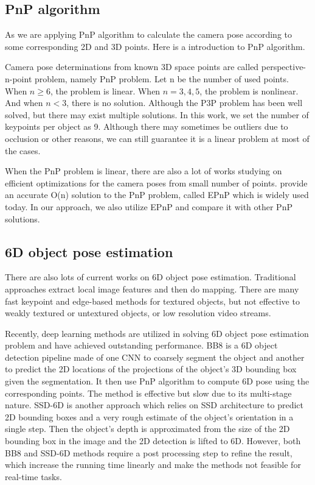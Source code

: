 \subsection{PnP algorithm}

As we are applying PnP algorithm to calculate the camera pose according to some corresponding 2D and 3D points. Here is a introduction to PnP algorithm.

Camera pose determinations from known 3D space points are called perspective-n-point problem, namely PnP problem. Let n be the number of used points. When $n \geq 6$, the problem is linear. When $n = 3,4,5$, the problem is nonlinear. And when $n < 3$, there is no solution. Although the P3P problem has been well solved, but there may exist multiple solutions. In this work, we set the number of keypoints per object as 9. Although there may sometimes be outliers due to occlusion or other reasons, we can still guarantee it is a linear problem at most of the cases.

When the PnP problem is linear, there are also a lot of works studying on efficient optimizations for the camera poses from small number of points. \cite{lepetit2009epnp} provide an accurate O(n) solution to the PnP problem, called EPnP which is widely used today. In our approach, we also utilize EPnP and compare it with other PnP solutions.

\subsection{6D object pose estimation}

There are also lots of current works on 6D object pose estimation. Traditional approaches extract local image features and then do mapping. There are many fast keypoint and edge-based methods for textured objects, but not effective to weakly textured or untextured objects, or low resolution video streams.

Recently, deep learning methods are utilized in solving 6D object pose estimation problem and have achieved outstanding performance. BB8 is a 6D object detection pipeline made of one CNN to coarsely segment the object and another to predict the 2D locations of the projections of the object's 3D bounding box given the segmentation. It then use PnP algorithm to compute 6D pose using the corresponding points. The method is effective but slow due to its multi-stage nature. SSD-6D is another approach which relies on SSD architecture to predict 2D bounding boxes and a very rough estimate of the object's orientation in a single step. Then the object's depth is approximated from the size of the 2D bounding box in the image and the 2D detection is lifted to 6D. However, both BB8 and SSD-6D methods require a post processing step to refine the result, which increase the running time linearly and make the methods not feasible for real-time tasks.


